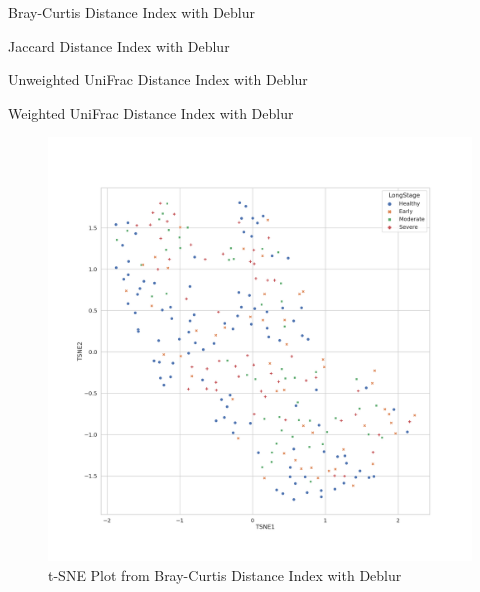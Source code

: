 \documentclass[a4paper]{article}
\begin{document}
            \begin{table}[p]
                \centering
                \caption{Bray-Curtis Distance Index with Deblur}
                \label{tb:bray-deblur}
            \end{table}

            \begin{table}[p]
                \centering
                \caption{Jaccard Distance Index with Deblur}
                \label{tb:jaccard-deblur}
            \end{table}

            \begin{table}[p]
                \centering
                \caption{Unweighted UniFrac Distance Index with Deblur}
                \label{tb:unweighted-deblur}
            \end{table}

            \begin{table}[p]
                \centering
                \caption{Weighted UniFrac Distance Index with Deblur}
                \label{tb:weighted-deblur}
            \end{table}

            \begin{figure}[p]
                \centering
                \includegraphics[width=0.6 \linewidth]{figures/BetaDiversity/Deblur.bray_curtis.png}
                \caption{t-SNE Plot from Bray-Curtis Distance Index with Deblur}
                \label{fig:tsne-bray-deblur}
            \end{figure}
\end{document}
